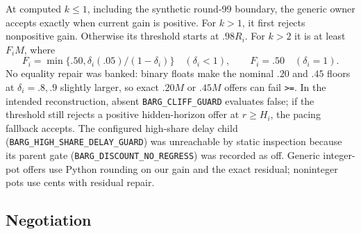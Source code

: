 At computed $k\leq1$, including the synthetic round-99 boundary, the generic
owner accepts exactly when current gain is positive. For $k>1$, it first rejects
nonpositive gain. Otherwise its threshold starts at $.98R_i$. For $k>2$ it is
at least $F_iM$, where
\[
F_i=\min\{.50,\delta_i(.05)/(1-\delta_i)\}\quad(\delta_i<1),
\qquad F_i=.50\quad(\delta_i=1).
\]
No equality repair was banked: binary floats make the nominal $.20$ and $.45$
floors at $\delta_i=.8,.9$ slightly larger, so exact $.20M$ or $.45M$ offers can
fail \texttt{>=}. In the intended reconstruction, absent
\texttt{BARG\_CLIFF\_GUARD} evaluates false; if the threshold still rejects a
positive hidden-horizon offer at $r\geq H_i$, the pacing fallback accepts. The
configured high-share delay child (\texttt{BARG\_HIGH\_SHARE\_DELAY\_GUARD})
was unreachable by static inspection because its parent gate
(\texttt{BARG\_DISCOUNT\_NO\_REGRESS}) was recorded as off. Generic integer-pot offers use Python rounding on
our gain and the exact residual; noninteger pots use cents with residual repair.

\subsection{Negotiation}
\label{app:policy-negotiation}


